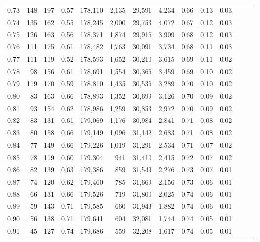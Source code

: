 \begin{tabular}{rrrrrrrrrrrrrr}
0.73 &     148 &  197 &  0.57 &  178,110 &    2,135 &  29,591 &   4,234 &  0.66 &  0.13 &      0.03 \\
0.74 &     135 &  162 &  0.55 &  178,245 &    2,000 &  29,753 &   4,072 &  0.67 &  0.12 &      0.03 \\
0.75 &     126 &  163 &  0.56 &  178,371 &    1,874 &  29,916 &   3,909 &  0.68 &  0.12 &      0.03 \\
0.76 &     111 &  175 &  0.61 &  178,482 &    1,763 &  30,091 &   3,734 &  0.68 &  0.11 &      0.03 \\
0.77 &     111 &  119 &  0.52 &  178,593 &    1,652 &  30,210 &   3,615 &  0.69 &  0.11 &      0.02 \\
0.78 &      98 &  156 &  0.61 &  178,691 &    1,554 &  30,366 &   3,459 &  0.69 &  0.10 &      0.02 \\
0.79 &     119 &  170 &  0.59 &  178,810 &    1,435 &  30,536 &   3,289 &  0.70 &  0.10 &      0.02 \\
0.80 &      83 &  163 &  0.66 &  178,893 &    1,352 &  30,699 &   3,126 &  0.70 &  0.09 &      0.02 \\
0.81 &      93 &  154 &  0.62 &  178,986 &    1,259 &  30,853 &   2,972 &  0.70 &  0.09 &      0.02 \\
0.82 &      83 &  131 &  0.61 &  179,069 &    1,176 &  30,984 &   2,841 &  0.71 &  0.08 &      0.02 \\
0.83 &      80 &  158 &  0.66 &  179,149 &    1,096 &  31,142 &   2,683 &  0.71 &  0.08 &      0.02 \\
0.84 &      77 &  149 &  0.66 &  179,226 &    1,019 &  31,291 &   2,534 &  0.71 &  0.07 &      0.02 \\
0.85 &      78 &  119 &  0.60 &  179,304 &      941 &  31,410 &   2,415 &  0.72 &  0.07 &      0.02 \\
0.86 &      82 &  139 &  0.63 &  179,386 &      859 &  31,549 &   2,276 &  0.73 &  0.07 &      0.01 \\
0.87 &      74 &  120 &  0.62 &  179,460 &      785 &  31,669 &   2,156 &  0.73 &  0.06 &      0.01 \\
0.88 &      66 &  131 &  0.66 &  179,526 &      719 &  31,800 &   2,025 &  0.74 &  0.06 &      0.01 \\
0.89 &      59 &  143 &  0.71 &  179,585 &      660 &  31,943 &   1,882 &  0.74 &  0.06 &      0.01 \\
0.90 &      56 &  138 &  0.71 &  179,641 &      604 &  32,081 &   1,744 &  0.74 &  0.05 &      0.01 \\
0.91 &      45 &  127 &  0.74 &  179,686 &      559 &  32,208 &   1,617 &  0.74 &  0.05 &      0.01 \\

\end{tabular}
